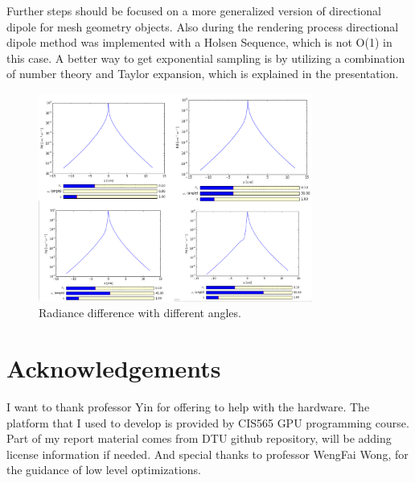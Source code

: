 \documentclass[11pt]{article}
\begin{document}
Further steps should be focused on a more generalized version of directional dipole for mesh geometry objects. 
Also during the rendering process directional dipole method was implemented with a Holsen Sequence, which is not 
O(1) in this case. A better way to get exponential sampling is by utilizing a combination of 
number theory and Taylor expansion, which is explained in the presentation.
\begin{figure}[htb]
\centering
\includegraphics[width=9cm]{./img/analysis.png}
\caption{\label{fig:o3}
Radiance difference with different angles.}
\end{figure}






\section{Acknowledgements}
\label{sec:orgheadline9}
I want to thank professor Yin for offering to help with the hardware. 
The platform  that I used to develop is provided by CIS565 GPU programming course. 
Part of my report material comes from DTU github repository, will be adding license information if needed.
And special thanks to professor WengFai Wong, for the guidance of low
level optimizations. 


{}


\end{document}
